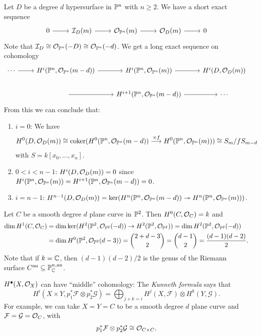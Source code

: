 \begin{example}
  Let $D$ be a degree $d$ hypersurface
  in $\mathbb{P}^n$ with $n \ge 2$. We have a
  short exact sequence
  \[
    \begin{tikzcd}
      0 \ar[r] & \mathcal{I}_D(m)
      \ar[r] & \OO_{\PP^n}(m) \ar[r] & \OO_D(m) \ar[r] & 0
    \end{tikzcd}
  \]
  Note that $\mathcal{I}_D \cong \mathcal{O}_{\mathbb{P}^n}(-D) \cong \mathcal{O}_{\mathbb{P}^n}(-d)$.
  We get a long exact sequence on cohomology
  \[
    \begin{tikzcd}
      \cdots \ar[r] & H^i(\PP^n, \OO_{\PP^n}(m - d)) \ar[r] & H^i(\PP^n, \OO_{\PP^n}(m)) \ar[r] & H^i(D, \OO_D(m)) \\ & \ar[r] & H^{i + 1}(\PP^n, \OO_{\PP^n}(m - d)) \ar[r] & \cdots
    \end{tikzcd}
  \]
  From this we can conclude that:
  \begin{enumerate}
    \item $i = 0$: We have
      \[
        H^0(D, \mathcal{O}_D(m))
        \cong \operatorname{coker}(H^0(\mathbb{P}^n, \mathcal{O}_{\mathbb{P}^n}(m - d)) \overset{\times f}{\longrightarrow} H^0(\mathbb{P}^n, \mathcal{O}_{\mathbb{P}^n}(m)))
        \cong S_m / f S_{m - d}
      \]
      with $S = k[x_0, \dots, x_n]$.
    \item $0 < i < n - 1$:
      $H^i(D, \mathcal{O}_D(m)) = 0$
      since $H^i(\mathbb{P}^n, \mathcal{O}_{\mathbb{P}^n}(m)) = H^{i + 1}(\mathbb{P}^n, \mathcal{O}_{\mathbb{P}^n}(m - d)) = 0$.
    \item $i = n - 1$:
      $H^{n - 1}(D, \mathcal{O}_D(m)) = \ker(H^n(\mathbb{P}^n, \mathcal{O}_{\mathbb{P}^n}(m - d)) \twoheadrightarrow H^n(\mathbb{P}^n, \mathcal{O}_{\mathbb{P}^n}(m)))$.
  \end{enumerate}
\end{example}

\begin{example}
  Let $C$ be a smooth degree $d$ plane curve
  in $\mathbb{P}^2$. Then $H^0(C, \mathcal{O}_C) = k$ and
  \begin{align*}
    \dim H^1(C, \mathcal{O}_C)
    &= \dim \ker(H^2(\mathbb{P}^2, \mathcal{O}_{\mathbb{P}^2}(-d)) \to H^2(\mathbb{P}^2, \mathcal{O}_{\mathbb{P}^2}))
    = \dim H^2(\mathbb{P}^2, \mathcal{O}_{\mathbb{P}^2}(-d)) \\
    &= \dim H^0(\mathbb{P}^2, \mathcal{O}_{\mathbb{P}^2}(d - 3))
    = \binom{2 + d - 3}{2} = \binom{d - 1}{2}
    = \frac{(d - 1)(d - 2)}{2}.
  \end{align*}
  Note that if $k = \mathbb{C}$, then
  $(d - 1)(d - 2) / 2$ is the genus of the
  Riemann surface
  $C^{\mathrm{an}} \subseteq \mathbb{P}^{n, \mathrm{an}}_{\mathbb{C}}$.
\end{example}

\begin{example}
  $H^\bullet(X, \mathcal{O}_X)$ can have
  ``middle'' cohomology: The
  \emph{Kunneth formula} says that
  \[
    H^i(X \times Y, p_1^* \mathcal{F} \otimes p_2^* \mathcal{G})
    = \bigoplus_{j + k = i}
    H^j(X, \mathcal{F}) \otimes H^k(Y, \mathcal{G}).
  \]
  For example, we can take
  $X = Y = C$ to be a smooth degree
  $d$ plane curve and
  $\mathcal{F} = \mathcal{G} = \mathcal{O}_C$,
  with
  \[
    p_1^* \mathcal{F}
    \otimes p_2^* \mathcal{G}
    \cong \mathcal{O}_{C \times C}.
  \]
\end{example}

